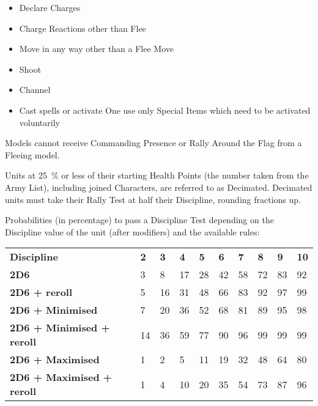 \begin{minipage}[t]{0.485\textwidth}
\begin{itemize}[itemsep=0pt]
\item Declare Charges
\item Charge Reactions other than Flee
\item Move in any way other than a Flee Move
\item Shoot
\item Channel
\item Cast spells or activate One use only Special Items which need to be activated voluntarily
\end{itemize}

Models cannot receive Commanding Presence or Rally Around the Flag from a Fleeing model.


Units at \SI{25}{\percent} or less of their starting Health Points (the number taken from the Army List), including joined Characters, are referred to as Decimated. Decimated units must take their Rally Test at half their Discipline, rounding fractions up.

\end{minipage}

\separator\vspace*{-10pt}



Probabilities (in percentage) to pass a Discipline Test depending on the Discipline value of the unit (after modifiers) and the available rules:

{
\begin{center}
\setlength{\tabcolsep}{3pt}
\alternaterowcolors\begin{tabular}{M{4.5cm}*{9}{M{0.58cm}}}
\hline
\textbf{Discipline} & \textbf{2} & \textbf{3} & \textbf{4} & \textbf{5} & \textbf{6} & \textbf{7} & \textbf{8} & \textbf{9} & \textbf{10} \\
\textbf{2D6} & \num{3} & \num{8} & \num{17} & \num{28} & \num{42} & \num{58} & \num{72} & \num{83} & \num{92} \\
\textbf{2D6 + reroll} & \num{5} & \num{16} & \num{31} & \num{48} & \num{66} & \num{83} & \num{92} & \num{97} & \num{99} \\
\textbf{2D6 + Minimised} & \num{7} & \num{20} & \num{36} & \num{52} & \num{68} & \num{81} & \num{89} & \num{95} & \num{98} \\
\textbf{2D6 + Minimised + reroll} & \num{14} & \num{36} & \num{59} & \num{77} & \num{90} & \num{96} & \num{99} & \num{99} & \num{99} \\
\textbf{2D6 + Maximised} & \num{1} & \num{2} & \num{5} & \num{11} & \num{19} & \num{32} & \num{48} & \num{64} & \num{80} \\
\textbf{2D6 + Maximised + reroll} & \num{1} & \num{4} & \num{10} & \num{20} & \num{35} & \num{54} & \num{73} & \num{87} & \num{96} \\
\hline
\end{tabular}
\end{center}
}

